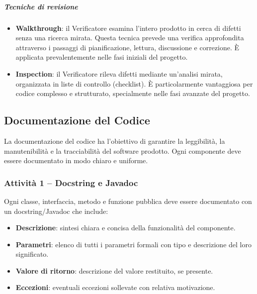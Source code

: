 \documentclass[a4paper, 11pt, oneside]{scrartcl}
\begin{document}
\subparagraph{Tecniche di revisione}
\begin{itemize}
    \item \textbf{Walkthrough}{\scriptsize{}}: il Verificatore esamina l'intero prodotto in cerca di difetti senza una ricerca mirata. Questa tecnica prevede una verifica approfondita attraverso i passaggi di pianificazione, lettura, discussione e correzione. È applicata prevalentemente nelle fasi iniziali del progetto.
    \item \textbf{Inspection}{\scriptsize{}}: il Verificatore rileva difetti mediante un'analisi mirata, organizzata in liste di controllo (checklist). È particolarmente vantaggiosa per codice complesso e strutturato, specialmente nelle fasi avanzate del progetto.
\end{itemize}

\subsection{Documentazione del Codice}
\label{sec:documentazione_codice}

La documentazione del codice ha l'obiettivo di garantire la leggibilità, la manutenibilità e la tracciabilità del software{\scriptsize{}} prodotto. Ogni componente deve essere documentato in modo chiaro e uniforme.

\subsubsection{Attività 1 -- Docstring e Javadoc}

Ogni classe, interfaccia, metodo e funzione pubblica deve essere documentato con un docstring/Javadoc che include:
\begin{itemize}
    \item \textbf{Descrizione}: sintesi chiara e concisa della funzionalità del componente.
    \item \textbf{Parametri}: elenco di tutti i parametri formali con tipo e descrizione del loro significato.
    \item \textbf{Valore di ritorno}: descrizione del valore restituito, se presente.
    \item \textbf{Eccezioni}: eventuali eccezioni sollevate con relativa motivazione.
\end{itemize}
\end{document}
